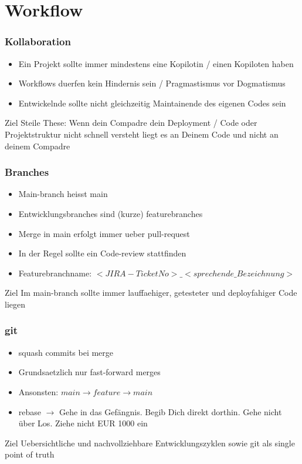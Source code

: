 \section{Workflow}
\begin{frame}
    \frametitle{Kollaboration}
    \begin{itemize}
        \item Ein Projekt sollte immer mindestens eine Kopilotin / einen Kopiloten haben
        \item Workflows duerfen kein Hindernis sein / Pragmastismus vor Dogmatismus
        \item Entwickelnde sollte nicht gleichzeitig Maintainende des eigenen Codes sein
    \end{itemize}
    \begin{block}{Ziel}
        Steile These: Wenn dein Compadre dein Deployment / Code oder Projektstruktur nicht schnell versteht liegt es an Deinem Code und nicht an deinem Compadre
    \end{block}
\end{frame}
\begin{frame}
    \frametitle{Branches}
    \begin{itemize}
    \item Main-branch heisst main
    \item Entwicklungsbranches sind (kurze) featurebranches
    \item Merge in main erfolgt immer ueber pull-request
    \item In der Regel sollte ein Code-review stattfinden
    \item Featurebranchname: $<JIRA-TicketNo>\_<sprechende\_Bezeichnung>$
    \end{itemize}
    \begin{block}{Ziel}
      Im main-branch sollte immer lauffaehiger, getesteter und deployfahiger Code liegen
      \end{block}
  \end{frame}

\begin{frame}
    \frametitle{git}
    \begin{itemize}
    \item squash commits bei merge
    \item Grundsaetzlich nur fast-forward merges
    \item Ansonsten: $ main  \rightarrow feature \rightarrow main $
    \item rebase $\rightarrow$ Gehe in das Gefängnis. Begib Dich direkt dorthin. Gehe nicht über Los. Ziehe nicht EUR 1000 ein 
    \end{itemize}
    \begin{block}{Ziel}
      Uebersichtliche und nachvollziehbare Entwicklungszyklen sowie git als single point of truth
      \end{block}
\end{frame}

